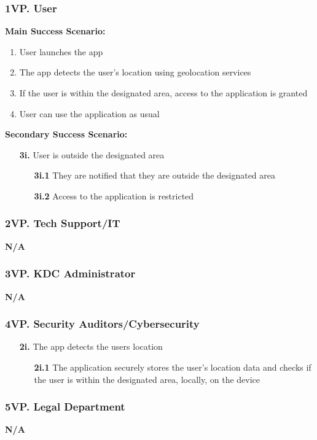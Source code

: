 \documentclass[]{article}
\begin{document}
\subsubsection*{1VP. User}
\textbf{Main Success Scenario:}
\begin{enumerate}
	\item User launches the app
	\item The app detects the user's location using geolocation services
	\item If the user is within the designated area, access to the application is granted
	\item User can use the application as usual
\end{enumerate}
\textbf{Secondary Success Scenario:}
\begin{enumerate}
	\item[\textbf{3i.}] User is outside the designated area
		\begin{enumerate}
			\item[\textbf{3i.1}] They are notified that they are outside the designated area
			\item[\textbf{3i.2}] Access to the application is restricted
		\end{enumerate}
\end{enumerate}
\subsubsection*{2VP. Tech Support/IT}
\textbf{N/A}
\subsubsection*{3VP. KDC Administrator}
\textbf{N/A}
\subsubsection*{4VP. Security Auditors/Cybersecurity}
\begin{enumerate}
	\item[\textbf{2i.}] The app detects the users location
		\begin{enumerate}
			\item[\textbf{2i.1}] The application securely stores the user's location data and checks if the user is within the designated area, locally, on the device
		\end{enumerate}
\end{enumerate}
\subsubsection*{5VP. Legal Department}
\textbf{N/A}
\end{document}
